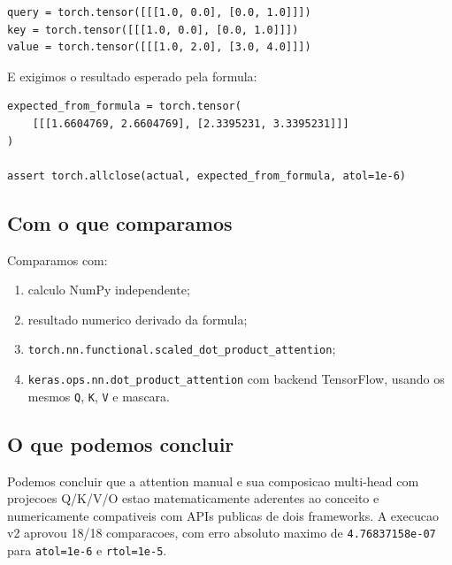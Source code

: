 \begin{Verbatim}[fontsize=\small,breaklines=true,label=python]
query = torch.tensor([[[1.0, 0.0], [0.0, 1.0]]])
key = torch.tensor([[[1.0, 0.0], [0.0, 1.0]]])
value = torch.tensor([[[1.0, 2.0], [3.0, 4.0]]])
\end{Verbatim}



E exigimos o resultado esperado pela formula:



\begin{Verbatim}[fontsize=\small,breaklines=true,label=python]
expected_from_formula = torch.tensor(
    [[[1.6604769, 2.6604769], [2.3395231, 3.3395231]]]
)

assert torch.allclose(actual, expected_from_formula, atol=1e-6)
\end{Verbatim}



\subsection{Com o que comparamos}



Comparamos com:


\begin{enumerate}
\item calculo NumPy independente;
\item resultado numerico derivado da formula;
\item \texttt{torch.\allowbreak{}nn.\allowbreak{}functional.\allowbreak{}scaled\_\allowbreak{}dot\_\allowbreak{}product\_\allowbreak{}attention};
\item \texttt{keras.\allowbreak{}ops.\allowbreak{}nn.\allowbreak{}dot\_\allowbreak{}product\_\allowbreak{}attention} com backend TensorFlow, usando os mesmos
\texttt{Q}, \texttt{K}, \texttt{V} e mascara.
\end{enumerate}


\subsection{O que podemos concluir}






Podemos concluir que a attention manual e sua composicao multi-head com projecoes Q/K/V/O estao matematicamente aderentes ao conceito e numericamente compativeis com APIs publicas de dois frameworks. A execucao v2 aprovou 18/18 comparacoes, com erro absoluto maximo de \texttt{4.\allowbreak{}76837158e-07} para \texttt{atol=1e-6} e \texttt{rtol=1e-5}.



